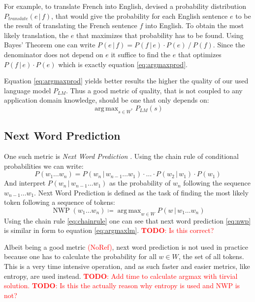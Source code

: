 \documentclass[11pt,a4paper]{article}
\newcommand\givenbase[1][]{\,#1\lvert\,}
\let\given\givenbase
\DeclareMathOperator*{\argmax}{arg\,max}
\newcommand{\probSymbol}[1][]{P_{#1}}
\newcommand{\prob}[2][]{\probSymbol[#1](#2)}
\newcommand{\probCond}[3][]{\prob[#1]{#2 \given #3}}
\newcommand{\nwp}[1]{\operatorname{NWP}(#1)}
\newcommand{\todo}[1]{\textcolor{red}{\textbf{TODO}: #1}}
\newcommand{\noref}{\textcolor{red}{(NoRef)}}
\begin{document}
For example, to translate French into English, \cite{Brown1990} devised a
probability distribution $\probCond[translate]{e}{f}$, that would give the
probability for each English sentence $e$ to be the result of translating
the French sentence $f$ into English.
To obtain the most likely translation, the $e$ that maximizes that probability
has to be found.
Using Bayes' Theorem one can write
$\probCond{e}{f} = {\probCond{f}{e}\cdot\prob{e} \mathbin{/} \prob{f}}$.
Since the denominator does not depend on $e$ it suffice to find the $e$ that
optimizes ${\probCond{f}{e} \cdot \prob{e}}$ which is exactly equation
\eqref{eq:argmaxprod}.

Equation \eqref{eq:argmaxprod} yields better results the higher the quality of our
used language model $\probSymbol[LM]$.
Thus a good metric of quality, that is not coupled to any application domain
knowledge, should be one that only depends on:
\begin{equation}\label{eq:argmaxlm}
  \argmax_{s \in W^*} \prob[LM]{s}
\end{equation}

\subsection{Next Word Prediction}

One such metric is \emph{Next Word Prediction} \parencite{Shannon1951}.
Using the chain rule of conditional probabilities we can write:
\begin{equation}\label{eq:chainrule}
  \prob{w_1 \ldots w_n} = \probCond{w_n}{w_{n-1} \ldots w_1} \cdot \ldots
                          \cdot \probCond{w_2}{w_1} \cdot \prob{w_1}
\end{equation}
And interpret $\probCond{w_n}{w_{n-1} \dots w_1}$ as the probability of $w_n$
following the sequence $w_{n-1} \ldots w_1$. Next Word Prediction is defined as
the task of finding the most likely token following a sequence of tokens:
\begin{equation}\label{eq:nwp}
  \nwp{w_1 \dots w_n} \coloneqq \argmax_{w \in W} \probCond{w}{w_1 \ldots w_n}
\end{equation}
Using the chain rule \eqref{eq:chainrule} one can see that next word
prediction \eqref{eq:nwp} is similar in form to equation \eqref{eq:argmaxlm}.
\todo{Is this correct?}

Albeit being a good metric \noref, next word prediction is not used in practice
because one has to calculate the probability for all $w \in W$, the set of all
tokens.
This is a very time intensive operation, and as such faster and easier metrics,
like entropy, are used instead.
\todo{Add time to calculate argmax with tirvial solution.}
\todo{Is this the actually reason why entropy is used and NWP is not?}
\end{document}
